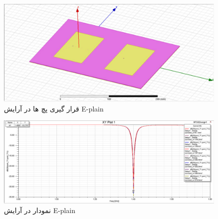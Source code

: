 \begin{figure}
	\includegraphics[scale=0.5]{Images/fig22.jpg}
	\caption{قرار گیری پچ ها در آرایش E-plain}
	\label{fig22}
\end{figure}
\begin{figure}
	\includegraphics[scale=0.5]{Images/fig23.jpg}
	\caption{نمودار  در آرایش E-plain }
	\label{fig23}
\end{figure}

